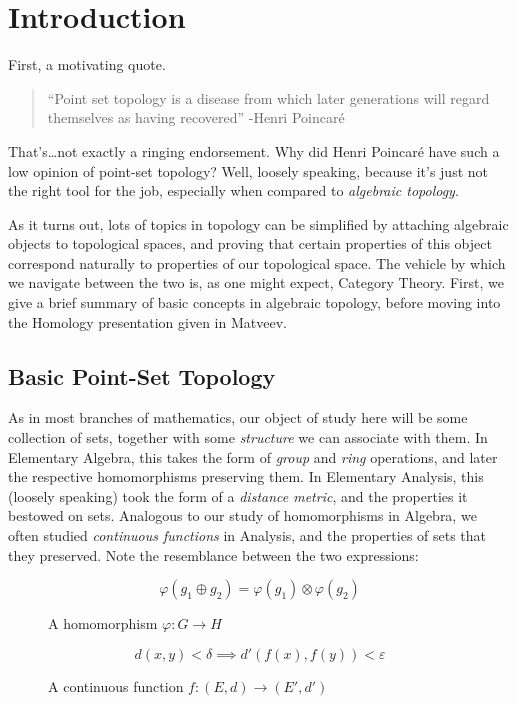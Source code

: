 \documentclass{fkbook}
\theoremstyle{snazzydefinition}
\begin{document}
\section{Introduction}
\begin{adjustwidth}{1em}{1em}
  First, a motivating quote.
  \begin{quote}
    ``Point set topology is a disease from which later generations
    will regard themselves as having recovered'' -Henri Poincar\'{e}
  \end{quote}
  That's\ldots not exactly a ringing endorsement. Why did Henri
  Poincar\'{e} have such a low opinion of point-set topology? Well,
  loosely speaking, because it's just not the right tool for the job,
  especially when compared to \emph{algebraic topology}.

  As it turns out, lots of topics in topology can be simplified by
  attaching algebraic objects to topological spaces, and proving that
  certain properties of this object correspond naturally to properties
  of our topological space. The vehicle by which we navigate between
  the two is, as one might expect, Category Theory. First, we give a
  brief summary of basic concepts in algebraic topology, before moving
  into the Homology presentation given in Matveev.

  \subsection{Basic Point-Set Topology}
  As in most branches of mathematics, our object of study here will be
  some collection of sets, together with some \emph{structure} we can
  associate with them. In Elementary Algebra, this takes the form of
  \emph{group} and \emph{ring} operations, and later the respective
  homomorphisms preserving them. In Elementary Analysis, this (loosely
  speaking) took the form of a \emph{distance metric}, and the
  properties it bestowed on sets. Analogous to our study of
  homomorphisms in Algebra, we often studied \emph{continuous
    functions} in Analysis, and the properties of sets that they
  preserved. Note the resemblance between the two expressions:
  \begin{minipage}[H]{.49\linewidth}
    \begin{figure}[H]
      \centering
      \[
        \varphi(g_1 \oplus g_2) = \varphi(g_1) \otimes \varphi(g_2)
      \]
      \caption*{A homomorphism $\varphi : G \to H$}
    \end{figure}
  \end{minipage}
  \begin{minipage}[H]{.49\linewidth}
    \begin{figure}[H]
      \centering
      \[
        d(x,y) < \delta \implies d'(f(x), f(y)) < \varepsilon
      \]
      \caption*{A continuous function $f : (E,d) \to (E', d')$}
    \end{figure}
  \end{minipage}


\end{adjustwidth}
\end{document}
